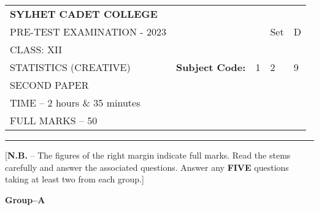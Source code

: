 \documentclass{article}
\begin{document}
\begin{table}[h]
\centering
\begin{tabular}{lllll}
\textbf{\large SYLHET CADET COLLEGE} &  &  &  &  \\ \cline{4-5} 
PRE-TEST EXAMINATION - 2023 &  & \multicolumn{1}{l|}{} & \multicolumn{1}{l|}{Set} & \multicolumn{1}{l|}{D} \\ \cline{4-5} 
CLASS: XII &  &  &  &  \\ \cline{3-5} 
STATISTICS (CREATIVE)& \multicolumn{1}{l|}{\textbf{Subject Code:}} & \multicolumn{1}{l|}{1} & \multicolumn{1}{l|}{2} & \multicolumn{1}{l|}{9} \\ \cline{3-5} 
 SECOND PAPER &  &  &  &  \\
TIME – 2 hours \& 35 minutes &  &  &  &  \\
FULL MARKS – 50 &  &  &  & 
\end{tabular}
\end{table}

\hrule

\begin{center}
[\textbf{N.B.} – The figures of the right margin indicate full marks. Read the stems carefully and answer the associated questions. Answer any \textbf{FIVE} questions taking at least two from each group.]\\

\end{center}

  \begin{center}
  \textbf{Group--A}
  \end{center}
  
\end{document}
